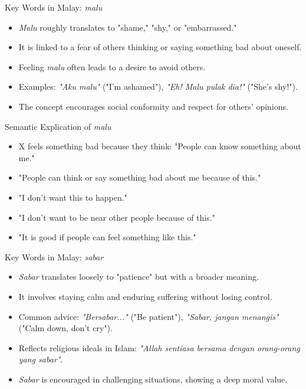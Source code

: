 \documentclass{beamer}
\begin{document}
\begin{frame}{Key Words in Malay: \textit{malu}}
    \begin{itemize}
        \item \textit{Malu} roughly translates to "shame," "shy," or "embarrassed."
        \item It is linked to a fear of others thinking or saying something bad about oneself.
        \item Feeling \textit{malu} often leads to a desire to avoid others.
        \item Examples: \textit{"Aku malu"} ("I'm ashamed"), \textit{"Eh! Malu pulak dia!"} ("She's shy!").
        \item The concept encourages social conformity and respect for others' opinions.
    \end{itemize}
\end{frame}

\begin{frame}{Semantic Explication of \textit{malu}}
    \begin{itemize}
        \item X feels something bad because they think: "People can know something about me."
        \item "People can think or say something bad about me because of this."
        \item "I don't want this to happen."
        \item "I don't want to be near other people because of this."
        \item "It is good if people can feel something like this."
    \end{itemize}
\end{frame}

\begin{frame}{Key Words in Malay: \textit{sabar}}
    \begin{itemize}
        \item \textit{Sabar} translates loosely to "patience" but with a broader meaning.
        \item It involves staying calm and enduring suffering without losing control.
        \item Common advice: \textit{"Bersabar..."} ("Be patient"), \textit{"Sabar, jangan menangis"} ("Calm down, don't cry").
        \item Reflects religious ideals in Islam: \textit{"Allah sentiasa bersama dengan orang-orang yang sabar"}.
        \item \textit{Sabar} is encouraged in challenging situations, showing a deep moral value.
    \end{itemize}
\end{frame}
\end{document}
